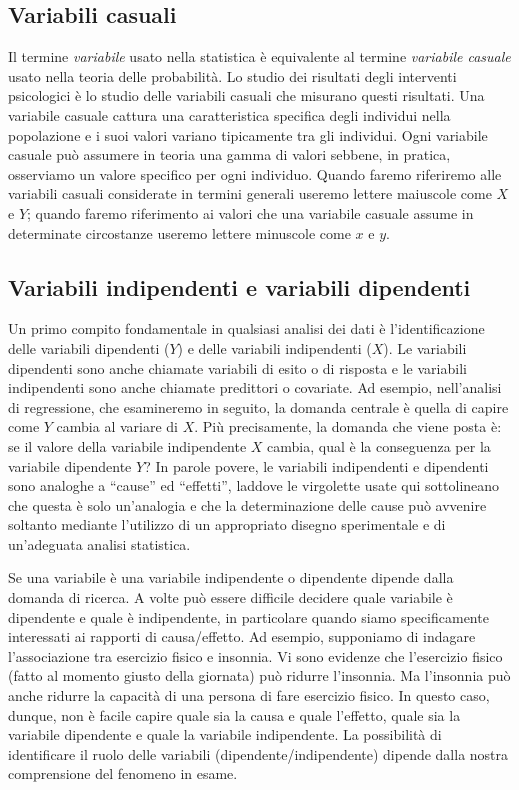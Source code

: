 \documentclass[
  11pt,
]{krantz}
\theoremstyle{definition}
\theoremstyle{definition}
\theoremstyle{definition}
\theoremstyle{definition}
\theoremstyle{remark}
\begin{document}
\hypertarget{variabili-casuali}{%
\subsection{Variabili casuali}\label{variabili-casuali}}

Il termine \emph{variabile} usato nella statistica è equivalente al termine \emph{variabile casuale} usato nella teoria delle probabilità. Lo studio dei risultati degli interventi psicologici è lo studio delle variabili casuali che misurano questi risultati. Una variabile casuale cattura una caratteristica specifica degli individui nella popolazione e i suoi valori variano tipicamente tra gli individui. Ogni variabile casuale può assumere in teoria una gamma di valori sebbene, in pratica, osserviamo un valore specifico per ogni individuo. Quando faremo riferiremo alle variabili casuali considerate in termini generali useremo lettere maiuscole come \(X\) e \(Y\); quando faremo riferimento ai valori che una variabile casuale assume in determinate circostanze useremo lettere minuscole come \(x\) e \(y\).

\hypertarget{variabili-indipendenti-e-variabili-dipendenti}{%
\subsection{Variabili indipendenti e variabili dipendenti}\label{variabili-indipendenti-e-variabili-dipendenti}}

Un primo compito fondamentale in qualsiasi analisi dei dati è l'identificazione delle variabili dipendenti (\(Y\)) e delle variabili indipendenti (\(X\)). Le variabili dipendenti sono anche chiamate variabili di esito o di risposta e le variabili indipendenti sono anche chiamate predittori o covariate. Ad esempio, nell'analisi di regressione, che esamineremo in seguito, la domanda centrale è quella di capire come \(Y\) cambia al variare di \(X\). Più precisamente, la domanda che viene posta è: se il valore della variabile indipendente \(X\) cambia, qual è la conseguenza per la variabile dipendente \(Y\)? In parole povere, le variabili indipendenti e dipendenti sono analoghe a ``cause'' ed ``effetti'', laddove le virgolette usate qui sottolineano che questa è solo un'analogia e che la determinazione delle cause può avvenire soltanto mediante l'utilizzo di un appropriato disegno sperimentale e di un'adeguata analisi statistica.

Se una variabile è una variabile indipendente o dipendente dipende dalla domanda di ricerca. A volte può essere difficile decidere quale variabile è dipendente e quale è indipendente, in particolare quando siamo specificamente interessati ai rapporti di causa/effetto. Ad esempio, supponiamo di indagare l'associazione tra esercizio fisico e insonnia. Vi sono evidenze che l'esercizio fisico (fatto al momento giusto della giornata) può ridurre l'insonnia. Ma l'insonnia può anche ridurre la capacità di una persona di fare esercizio fisico. In questo caso, dunque, non è facile capire quale sia la causa e quale l'effetto, quale sia la variabile dipendente e quale la variabile indipendente. La possibilità di identificare il ruolo delle variabili (dipendente/indipendente) dipende dalla nostra comprensione del fenomeno in esame.
\end{document}
